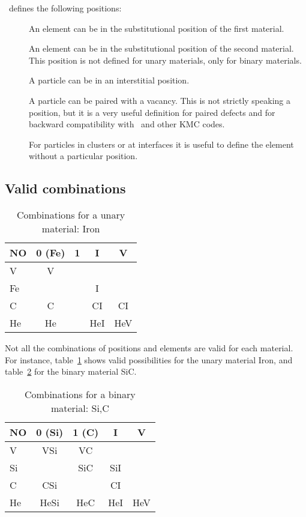 \MMonCa\ defines the following positions:

\begin{description}
\item [] An element can be in the substitutional position of the first material.
\item [] An element can be in the substitutional position of the second material. This position is not defined for unary materials, only for binary materials.
\item [] A particle can be in an interstitial position.
\item [] A particle can be paired with a vacancy. This is not strictly speaking a position, but it is a very useful definition for paired defects and for backward compatibility with \MMonCa\ and other KMC codes. 
\item [] For particles in clusters or at interfaces it is useful to define the element without a particular position. 
\end{description}

\subsection{Valid combinations}

\begin{table}
\caption{Combinations for a unary material: Iron}
\label{tab:unary}
\begin{center}
\begin{tabular}{l|cccc}
NO & 0 (Fe) & 1 & I   & V   \\\hline
V  & V      &   &     &     \\
Fe &        &   & I &       \\
C  & C      &   & CI  & CI  \\
He & He     &   & HeI & HeV \\
\end{tabular}
\end{center}
\end{table}

Not all the combinations of positions and elements are valid for each material. For instance, table~\ref{tab:unary} shows valid possibilities for the unary material Iron, and table~\ref{tab:binary} for the binary material SiC.

\begin{table}
\caption{Combinations for a binary material: Si,C}
\label{tab:binary}
\begin{center}
\begin{tabular}{l|cccc}
NO & 0 (Si) & 1 (C) & I & V   \\\hline
V  & VSi    & VC  &     &     \\
Si &        & SiC & SiI &     \\
C  & CSi    &     & CI  &     \\
He & HeSi   & HeC & HeI & HeV \\
\end{tabular}
\end{center}
\end{table}

